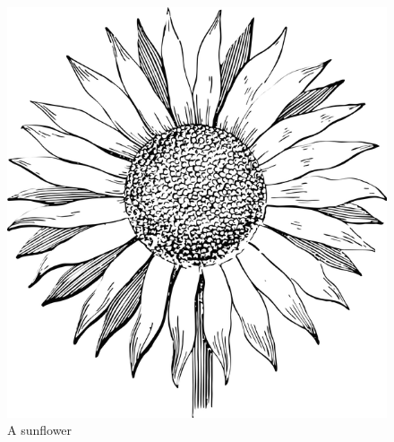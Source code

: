 \documentclass[
]{article}
\begin{document}
\begin{figure}

{\centering \includegraphics{sunflower.png}

}

\caption{\label{fig-sunflower}A sunflower}

\end{figure}
\end{document}
